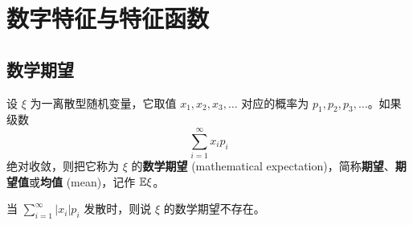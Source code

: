 \section{数字特征与特征函数}\label{sec:数字特征与特征函数}
\subsection{数学期望}\label{subsec:数学期望}
\begin{definition}[离散型随机变量的数学期望] \label{def:mathematical_expectation_discrete}
设 $\xi$ 为一离散型随机变量，它取值 $x_1,x_2,x_3,\ldots$ 对应的概率为 $p_1,p_2,p_3,\ldots$。如果级数
\begin{equation} \label{eq:mathematical_expectation_series}
\sum_{i=1}^\infty x_i p_i
\end{equation}
绝对收敛，则把它称为 $\xi$ 的\textbf{数学期望} (mathematical expectation)，简称\textbf{期望}、\textbf{期望值}或\textbf{均值} (mean)，记作 $\mathbb{E}\xi$。

\end{definition}
\begin{remark}
    当 $\sum_{i=1}^\infty |x_i|p_i$ 发散时，则说 $\xi$ 的数学期望不存在。
\end{remark}

